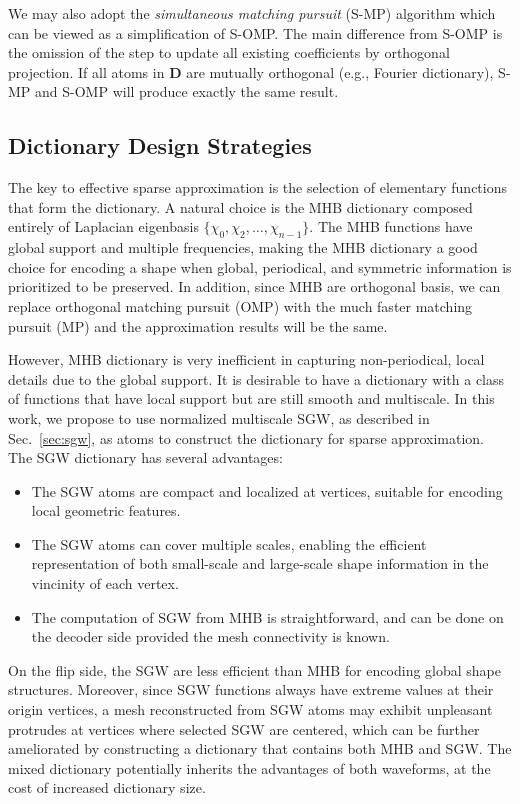We may also adopt the \emph{simultaneous matching pursuit} (S-MP) algorithm
which can be viewed as a simplification of S-OMP. The main difference from S-OMP is
the omission of the step to update all existing coefficients by orthogonal projection.
If all atoms in $\mathbf{D}$ are mutually orthogonal (e.g., Fourier dictionary), S-MP and S-OMP
will produce exactly the same result.

\subsection{Dictionary Design Strategies}
\label{sec:dictionary}

The key to effective sparse approximation is the selection of
elementary functions that form the dictionary. A natural choice is the
MHB dictionary composed entirely of Laplacian eigenbasis
$\{\chi_0,\chi_2,\ldots,\chi_{n-1}\}$. The MHB functions have global
support and multiple frequencies, making the MHB dictionary a good
choice for encoding a shape when global, periodical, and symmetric
information is prioritized to be preserved. In addition, since MHB are
orthogonal basis, we can replace orthogonal matching pursuit (OMP)
with the much faster matching pursuit (MP) and the approximation
results will be the same.

However, MHB dictionary is very inefficient in capturing
non-periodical, local details due to the global support. It is
desirable to have a dictionary with a class of functions that have
local support but are still smooth and multiscale. In this work, we
propose to use normalized multiscale SGW, as described in
Sec.~\ref{sec:sgw}, as atoms to construct the dictionary for sparse
approximation. The SGW dictionary has several advantages:
\begin{itemize}
\item The SGW atoms are compact and localized at vertices, suitable
  for encoding local geometric features.
\item The SGW atoms can cover multiple scales, enabling the efficient
  representation of both small-scale and large-scale shape information
  in the vincinity of each vertex.
\item The computation of SGW from MHB is straightforward, and can be
  done on the decoder side provided the mesh connectivity is known.
\end{itemize}

On the flip side, the SGW are less efficient than MHB for encoding
global shape structures. Moreover, since SGW functions always have
extreme values at their origin vertices, a mesh reconstructed from SGW
atoms may exhibit unpleasant protrudes at vertices where selected SGW
are centered, which can be further ameliorated by constructing a
dictionary that contains both MHB and SGW. The mixed dictionary
potentially inherits the advantages of both waveforms, at the cost of
increased dictionary size.

